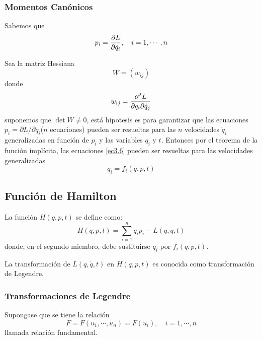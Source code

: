 \documentclass[../main]{subfiles}
\begin{document}
\subsubsection{Momentos Canónicos}
Sabemos que 
\begin{equation}
    p_i=\pdv{L}{\dot{q}_i},\quad i=1, \cdots, n
    \label{ec3.6}
\end{equation}

Sea la matriz Hessiana
\begin{equation}
    W=(w_{ij})
\end{equation}
donde 
\begin{equation}
    w_{ij}=\pdv{^2 L}{\dot{q}_i \partial \dot{q}_j}
\end{equation}
suponemos que $\det W\neq 0$, está hipotesis es para garantizar que las ecuaciones $p_i=\partial L/\partial \dot{q}_i$($n$ ecuaciones) pueden ser resueltas para las $n$ velocidades $\dot{q}_i$ generalizadas en función de $p_i$ y las variables $q_i$ y $t$. Entonces por el teorema de la función implícita, las ecuaciones \eqref{ec3.6} pueden ser resueltas para las velocidades generalizadas 
\begin{equation}
    \dot{q}_i=f_i(q, p, t)
\end{equation}

\subsection{Función de Hamilton}
La función $H(q, p, t)$ se define como:
\begin{equation}
    H(q, p, t)=\sum_{i=1}^n \dot{q}_i p_i-L(q, \dot{q}, t)
\end{equation}
donde, en el segundo miembro, debe sustituirse $\dot{q}_i$ por $f_i(q, p, t)$.

La transformación de $L(q, \dot{q}, t)$ en $H(q, p, t)$ es conocida como transformación de Legendre.

\subsubsection{Transformaciones de Legendre}

Supongase que se tiene la relación 
\begin{equation}
    F=F(u_1, \cdots, u_n)=F(u_i),\quad i=1, \cdots, n
\end{equation}
llamada relación fundamental.
\end{document}
